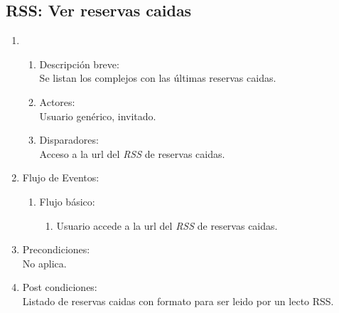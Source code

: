 \documentclass[a4paper,11pt]{article}
\begin{document}
\subsection{RSS: Ver reservas caidas}
\begin{enumerate}
    \item
        \begin{enumerate}
            \item Descripci\'on breve: \\
                Se listan los complejos con las \'ultimas reservas caidas.
            \item Actores: \\
                Usuario gen\'erico, invitado.
            \item Disparadores: \\
                Acceso a la url del \emph{RSS} de reservas caidas.
        \end{enumerate}
    \item Flujo de Eventos:
        \begin{enumerate}
            \item Flujo b\'asico:
		\begin{enumerate}
		\item Usuario accede a la url del \emph{RSS} de reservas caidas.
        	\end{enumerate}
	\end{enumerate}
    \item Precondiciones: \\
        No aplica.
    \item Post condiciones: \\
        Listado de reservas caidas con formato para ser leido por un lecto RSS.
\end{enumerate}

\end{document}
